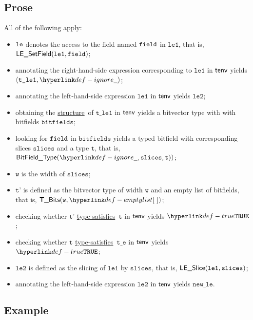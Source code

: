 \documentclass{book}
\newcommand\ProseOrTypeError[0]{\ProseTerminateAs{\TypeErrorConfig}}
\newcommand\structure[0]{\hyperlink{def-structure}{structure}}
\newcommand\typesatisfies[0]{\hyperlink{def-typesatisfies}{type-satisfies}}
\newcommand\vt[0]{\texttt{t}}
\newcommand\vte[0]{\texttt{t\_e}}
\newcommand\vleone[0]{\texttt{le1}}
\newcommand\vletwo[0]{\texttt{le2}}
\newcommand\vtleone[0]{\texttt{t\_le1}}
\newcommand\vw[0]{\texttt{w}}
\newcommand\bitfields[0]{\texttt{bitfields}}
\newcommand\vslices[0]{\texttt{slices}}
\newcommand\newle[0]{\texttt{new\_le}}
\newcommand\slices[0]{\texttt{slices}}
\newcommand\vtp[0]{\texttt{t'}}
\begin{document}
\subsection{Prose}
All of the following apply:
\begin{itemize}
  \item $\texttt{le}$ denotes the access to the field named $\texttt{field}$ in $\vleone$, that is, \\ $\LESetField(\vleone, \field)$;
  \item annotating the right-hand-side expression corresponding to $\vleone$ in $\textsf{tenv}$ yields \\ $(\vtleone, \Ignore)$\ProseOrTypeError;
  \item annotating the left-hand-side expression $\vleone$ in $\textsf{tenv}$ yields $\vletwo$\ProseOrTypeError;
  \item obtaining the \structure\ of $\vtleone$ in $\textsf{tenv}$ yields a bitvector type with with bitfields $\bitfields$\ProseOrTypeError;
  \item looking for $\texttt{field}$ in $\bitfields$ yields a typed bitfield with corresponding slices $\slices$ and a type $\vt$,
        that is, \\ $\BitFieldType(\Ignore, \vslices, \vt))$;
  \item $\vw$ is the width of $\slices$;
  \item $\vtp$ is defined as the bitvector type of width $\vw$ and an empty list of bitfields, that is, $\TBits(\vw , \emptylist)$;
  \item checking whether $\vtp$ \typesatisfies\ $\vt$ in $\textsf{tenv}$ yields $\True$\ProseOrTypeError;
  \item checking whether $\vt$ \typesatisfies\ $\vte$ in $\textsf{tenv}$ yields $\True$\ProseOrTypeError;
  \item $\vletwo$ is defined as the slicing of $\vleone$ by $\slices$, that is, $\LESlice(\vleone, \slices)$;
  \item annotating the left-hand-side expression $\vletwo$ in $\textsf{tenv}$ yields $\newle$\ProseOrTypeError.
\end{itemize}

\subsection{Example}

\end{document}

